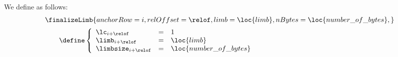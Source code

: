 We define \finalizeLimbName{} as follows:
\[
	\begin{array}{l}
		\finalizeLimb {
			anchorRow  = i                       ,
			relOffset  = \relof                  ,
			limb       = \loc{limb}              ,
			nBytes     = \loc{number\_of\_bytes} ,
		}
		\vspace{2mm} \\
		\qquad \define
		\left\{ \begin{array}{lcl}
			\lc       _{i + \relof} & = & 1                       \\
			\limb     _{i + \relof} & = & \loc{limb}              \\
			\limbsize _{i + \relof} & = & \loc{number\_of\_bytes} \\
		\end{array} \right.
	\end{array}
\]
